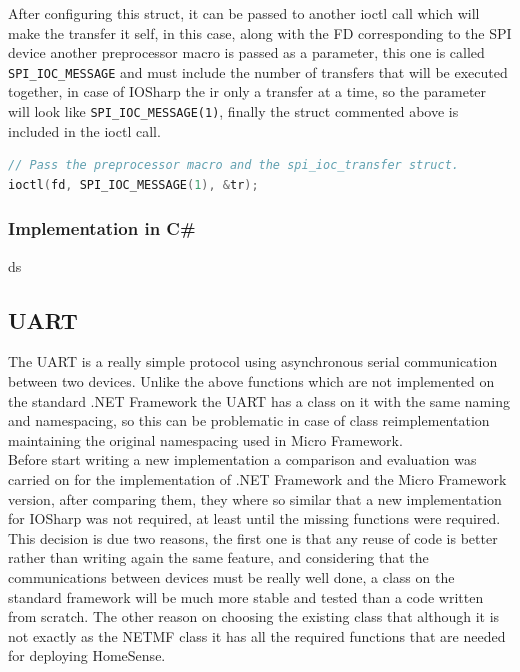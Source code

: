 After configuring this struct, it can be passed to another ioctl call which will make the transfer it self, in this case, along with the \gls{FD} corresponding to the SPI device another preprocessor macro is passed as a parameter, this one is called \verb!SPI_IOC_MESSAGE! and must include the number of transfers that will be executed together, in case of IOSharp the ir only a transfer at a time, so the parameter will look like \verb!SPI_IOC_MESSAGE(1)!, finally the struct commented above is included in the ioctl call.

\begin{lstlisting}[language=C, caption={IOSharp.c - SPI transfer}]
// Pass the preprocessor macro and the spi_ioc_transfer struct.
ioctl(fd, SPI_IOC_MESSAGE(1), &tr);
\end{lstlisting}

\subsubsection{Implementation in C\#}\label{SSS:IOSharp-SPI-Implementation-CSharp}
ds

\subsection{UART}\label{SS:IOSharp-UART}
The UART is a really simple protocol using asynchronous serial communication between two devices. Unlike the above functions which are not implemented on the standard .NET Framework the UART has a class on it with the same naming and namespacing, so this can be problematic in case of class reimplementation maintaining the original namespacing used in Micro Framework.
\\
Before start writing a new implementation a comparison and evaluation was carried on for the implementation of .NET Framework and the Micro Framework version, after comparing them, they where so similar that a new implementation for IOSharp was not required, at least until the missing functions were required. This decision is due two reasons, the first one is that any reuse of code is better rather than writing again the same feature, and considering that the communications between devices must be really well done, a class on the standard framework will be much more stable and tested than a code written from scratch. The other reason on choosing the existing class that although it is not exactly as the NETMF class it has all the required functions that are needed for deploying HomeSense.


